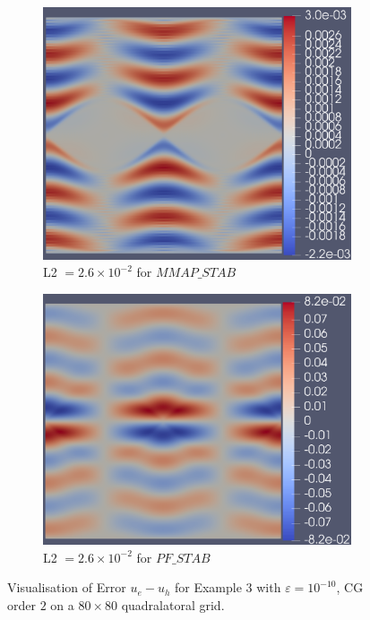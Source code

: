 \documentclass[12pt]{ociamthesis}
\begin{document}
\begin{figure}[H]
 \begin{subfigure}{0.5\textwidth}
     \includegraphics[width=\textwidth]{Pics/ErrorPlots/E3_MMAP_STAB.png}
     \caption{L2 $=2.6\times10^{-2}$ for $MMAP\_STAB$}
 \end{subfigure}
   \begin{subfigure}{0.5\textwidth}
     \includegraphics[width=\textwidth]{Pics/ErrorPlots/E3_PF_STAB.png}
     \caption{L2 $=2.6\times10^{-2}$ for $PF\_STAB$}
 \end{subfigure}
 \caption{Visualisation of Error $u_e-u_h$ for Example $3$ with $\varepsilon = 10^{-10}$, CG order $2$ on a $80 \times 80$ quadralatoral grid.} \label{E3_Error}
\end{figure}
\end{document}
